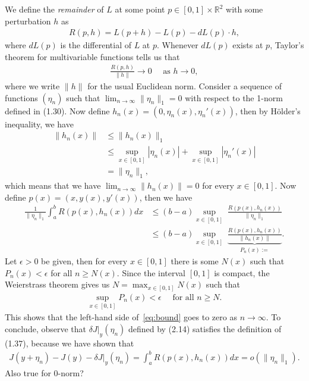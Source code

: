 \documentclass[a4paper]{article}
\begin{document}
%
We define the \textit{remainder} of $L$ at some point $p \in [0,1] \times \mathbb{R}^{2}$ with some
perturbation $h$ as
\begin{align*}
  R(p, h) = L(p + h) - L(p) - dL(p) \cdot h ,
\end{align*}
where $dL(p)$ is the differential of $L$ at $p$.
%
Whenever $dL(p)$ exists at $p$, Taylor's theorem for multivariable functions tells us that
\begin{align}
  \label{eq:taylor_remainder_convergence}
  \frac{R(p, h)}{\| h \|} \longrightarrow 0 \quad \text{ as } h \rightarrow 0,
\end{align}
where we write $\| h \|$ for the usual Euclidean norm.
%
Consider a sequence of functions $(\eta_{n})$ such that $\lim_{n \to \infty} \| \eta_{n} \|_{1} = 0$ with respect to the 1-norm defined in (1.30).
%
Now define
$h_{n}(x) =(0, \eta_{n}(x), \eta_{n}'(x))$, then by H\"{o}lder's inequality, we
have
\begin{align*}
  \| h_{n}(x) \| &\leq \| h_{n} (x) \|_{1} \\
                                                               & \leq \sup_{x \in [0,1]} |\eta_{n}(x)| + \sup_{x \in [0,1]} | \eta_{n}'(x) | \\
  &= \| \eta_{n} \|_{1} ,
\end{align*}
which means that we have $\lim_{n \to \infty} \|h_{n}(x)\| = 0$ for every $x \in [0, 1]$.
%
Now define $p(x)=(x,y(x),y'(x))$, %
then we have
\begin{subequations}
  \label{eq:bound}
\begin{align}
  \frac{1}{\| \eta_{n} \|_{1}}\int_{a}^{b} R(p(x), h_{n}(x)) dx &\leq (b-a) \sup_{x \in [0, 1]} \; \frac{R(p(x), h_{n}(x))}{\| \eta_{n} \|_{1}} \\
  & \leq (b-a) \sup_{x \in [0,1]} \; \underbrace{\frac{R(p(x), h_{n}(x))}{\|h_{n}(x)\|}}_{P_{n}(x) :=} .
\end{align}
\end{subequations}
Let $\epsilon > 0$ be given, then for every $x \in [0, 1]$ there is some $N(x)$ such that $P_{n}(x) < \epsilon$ for all $n \geq N(x)$.
Since the interval $[0, 1]$ is compact, the Weierstrass theorem gives us $N = \max_{x \in [0,1]} N(x)$ such that
\begin{align*}
  \sup_{x \in [0, 1]} P_{n}(x) < \epsilon \quad \text{ for all } n \geq N .
\end{align*}
This shows that the left-hand side of~\eqref{eq:bound} goes to zero as $n \rightarrow \infty$.
%
To conclude, observe that $\delta J|_{y}(\eta_{n})$ defined by (2.14) satisfies
the definition of (1.37), because we have shown that
\begin{align*}
  J(y + \eta_{n}) - J(y) - \delta J|_{y}(\eta_{n}) = \int_{a}^{b} R(p(x), h_{n}(x)) dx = o(\| \eta_{n} \|_{1}) .
\end{align*}
%
{\color{blue} Also true for 0-norm?}
\end{document}
